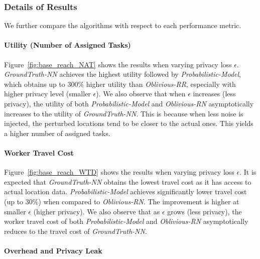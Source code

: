\documentclass{USC-Thesis}
\numberwithin{equation}{chapter}
\begin{document}
\subsubsection{Details of Results}

We further compare the algorithms with respect to each performance metric.

\paragraph{Utility (Number of Assigned Tasks)}

Figure~\ref{fig:base_reach_NAT} shows the results when varying privacy loss $\epsilon$. 
\emph{GroundTruth-NN} achieves the highest utility followed by \emph{Probabilistic-Model}, which obtains up to 300\% higher utility than \emph{Oblivious-RR}, especially with higher privacy level (smaller $\epsilon$).
We also observe that when $\epsilon$ increases (less privacy), the utility of both \emph{Probabilistic-Model} and \emph{Oblivious-RN} asymptotically increases to the utility of \emph{GroundTruth-NN}. This is because when less noise is injected, the perturbed locations tend to be closer to the actual ones. This yields a higher number of assigned tasks.

\paragraph{Worker Travel Cost}

Figure~\ref{fig:base_reach_WTD} shows the results when varying privacy loss $\epsilon$.
It is expected that \emph{GroundTruth-NN} obtains the lowest travel cost as it has access to actual location data.
\emph{Probabilistic-Model} achieves significantly lower travel cost (up to 30\%) when compared to \emph{Oblivious-RN}. The improvement is higher at smaller $\epsilon$ (higher privacy).
We also observe that as $\epsilon$ grows (less privacy), the worker travel cost of both \emph{Probabilistic-Model} and \emph{Oblivious-RN} asymptotically reduces to the travel cost of \emph{GroundTruth-NN}. 

\paragraph{Overhead and Privacy Leak}
\end{document}
